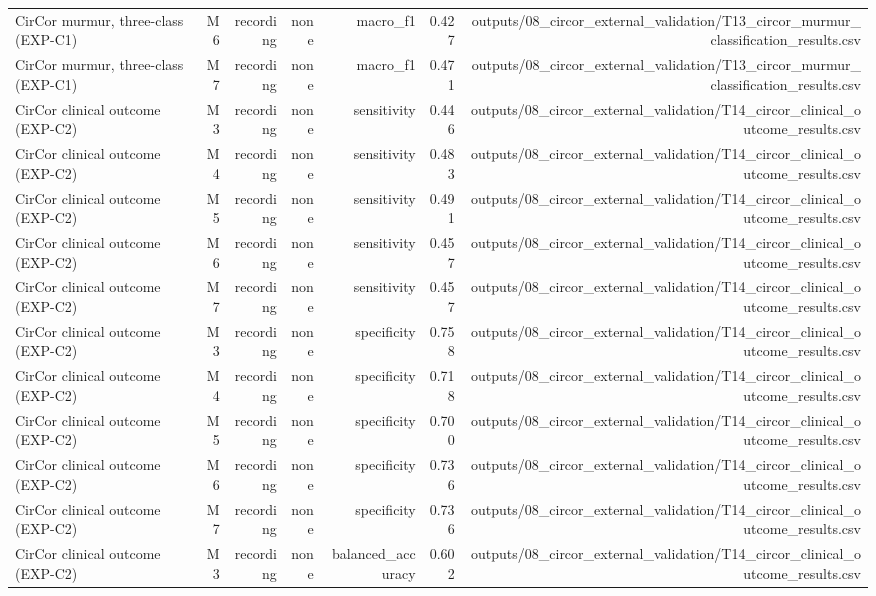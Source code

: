 \begin{table}[htbp]
\begin{tabular}{lrrrrrr}
    CirCor murmur, three-class (EXP-C1) & M6 & recording & none & macro\_f1 & 0.427 & outputs/08\_circor\_external\_validation/T13\_circor\_murmur\_classification\_results.csv \\
    CirCor murmur, three-class (EXP-C1) & M7 & recording & none & macro\_f1 & 0.471 & outputs/08\_circor\_external\_validation/T13\_circor\_murmur\_classification\_results.csv \\
    CirCor clinical outcome (EXP-C2) & M3 & recording & none & sensitivity & 0.446 & outputs/08\_circor\_external\_validation/T14\_circor\_clinical\_outcome\_results.csv \\
    CirCor clinical outcome (EXP-C2) & M4 & recording & none & sensitivity & 0.483 & outputs/08\_circor\_external\_validation/T14\_circor\_clinical\_outcome\_results.csv \\
    CirCor clinical outcome (EXP-C2) & M5 & recording & none & sensitivity & 0.491 & outputs/08\_circor\_external\_validation/T14\_circor\_clinical\_outcome\_results.csv \\
    CirCor clinical outcome (EXP-C2) & M6 & recording & none & sensitivity & 0.457 & outputs/08\_circor\_external\_validation/T14\_circor\_clinical\_outcome\_results.csv \\
    CirCor clinical outcome (EXP-C2) & M7 & recording & none & sensitivity & 0.457 & outputs/08\_circor\_external\_validation/T14\_circor\_clinical\_outcome\_results.csv \\
    CirCor clinical outcome (EXP-C2) & M3 & recording & none & specificity & 0.758 & outputs/08\_circor\_external\_validation/T14\_circor\_clinical\_outcome\_results.csv \\
    CirCor clinical outcome (EXP-C2) & M4 & recording & none & specificity & 0.718 & outputs/08\_circor\_external\_validation/T14\_circor\_clinical\_outcome\_results.csv \\
    CirCor clinical outcome (EXP-C2) & M5 & recording & none & specificity & 0.700 & outputs/08\_circor\_external\_validation/T14\_circor\_clinical\_outcome\_results.csv \\
    CirCor clinical outcome (EXP-C2) & M6 & recording & none & specificity & 0.736 & outputs/08\_circor\_external\_validation/T14\_circor\_clinical\_outcome\_results.csv \\
    CirCor clinical outcome (EXP-C2) & M7 & recording & none & specificity & 0.736 & outputs/08\_circor\_external\_validation/T14\_circor\_clinical\_outcome\_results.csv \\
    CirCor clinical outcome (EXP-C2) & M3 & recording & none & balanced\_accuracy & 0.602 & outputs/08\_circor\_external\_validation/T14\_circor\_clinical\_outcome\_results.csv \\

\end{tabular}
\end{table}
